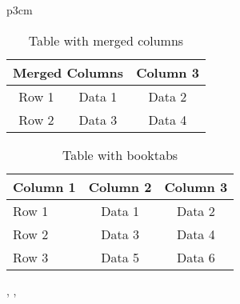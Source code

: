 p{3cm} %




\begin{table}[h]
    \centering
    \begin{tabular}{|c|c|c|}
        \hline
        \multicolumn{2}{|c|}{Merged Columns} & Column 3          \\ \hline
        Row 1                                & Data 1   & Data 2 \\ \hline
        Row 2                                & Data 3   & Data 4 \\ \hline
    \end{tabular}
    \caption{Table with merged columns}
    \label{tab:multicolumn}
\end{table}





\begin{table}[h]
    \centering
    \begin{tabular}{lcc}
        \toprule
        Column 1 & Column 2 & Column 3 \\ \midrule
        Row 1    & Data 1   & Data 2   \\
        Row 2    & Data 3   & Data 4   \\
        Row 3    & Data 5   & Data 6   \\ \bottomrule
    \end{tabular}
    \caption{Table with booktabs}
    \label{tab:booktabs}
\end{table}

\toprule, \midrule, \bottomrule %




\usepackage[table]{xcolor} %




